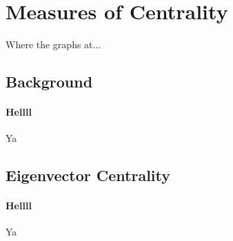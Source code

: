 \section{Measures of Centrality}

    Where the graphs at...
    
\subsection{Background}\label{sec:CentralityBackground}

\paragraph{Hellll}
	Ya
	
\subsection{Eigenvector Centrality}\label{sec:EigCentrality}

\paragraph{Hellll}
	Ya
